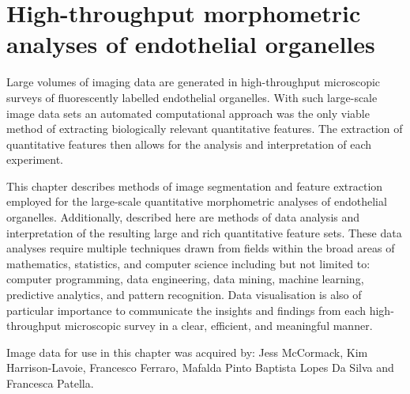 \chapter{High-throughput morphometric analyses of endothelial organelles}
\label{endothelial_morphometry}
\ifpdf
	\graphicspath{{chapter_2/figs/}}
\fi


Large volumes of imaging data are generated in high-throughput microscopic surveys of fluorescently labelled endothelial organelles. With such large-scale image data sets an automated computational approach was the only viable method of extracting biologically relevant quantitative features. The extraction of quantitative features then allows for the analysis and interpretation of each experiment.

This chapter describes methods of image segmentation and feature extraction employed for the large-scale quantitative morphometric analyses of endothelial organelles. Additionally, described here are methods of data analysis and interpretation of the resulting large and rich quantitative feature sets. These data analyses require multiple techniques drawn from fields within the broad areas of mathematics, statistics, and computer science including but not limited to: computer programming, data engineering, data mining, machine learning, predictive analytics, and pattern recognition. Data visualisation is also of particular importance to communicate the insights and findings from each high-throughput microscopic survey in a clear, efficient, and meaningful manner.

Image data for use in this chapter was acquired by: Jess McCormack, Kim Harrison-Lavoie, Francesco Ferraro, Mafalda Pinto Baptista Lopes Da Silva and Francesca Patella.

